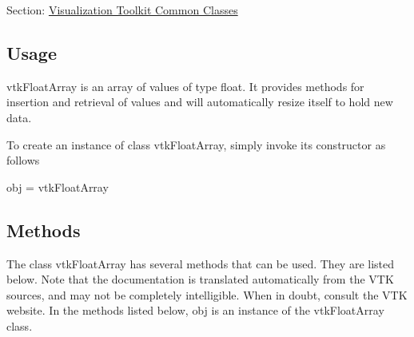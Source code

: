 Section\-: \hyperlink{sec_vtkcommon}{Visualization Toolkit Common Classes} \hypertarget{vtkwidgets_vtkxyplotwidget_Usage}{}\subsection{Usage}\label{vtkwidgets_vtkxyplotwidget_Usage}
vtk\-Float\-Array is an array of values of type float. It provides methods for insertion and retrieval of values and will automatically resize itself to hold new data.

To create an instance of class vtk\-Float\-Array, simply invoke its constructor as follows \begin{DoxyVerb}  obj = vtkFloatArray
\end{DoxyVerb}
 \hypertarget{vtkwidgets_vtkxyplotwidget_Methods}{}\subsection{Methods}\label{vtkwidgets_vtkxyplotwidget_Methods}
The class vtk\-Float\-Array has several methods that can be used. They are listed below. Note that the documentation is translated automatically from the V\-T\-K sources, and may not be completely intelligible. When in doubt, consult the V\-T\-K website. In the methods listed below, {\ttfamily obj} is an instance of the vtk\-Float\-Array class. 
